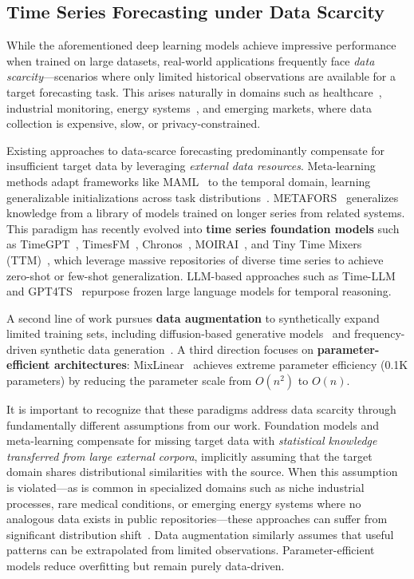 \subsection{Time Series Forecasting under Data Scarcity}

While the aforementioned deep learning models achieve impressive performance when trained on large datasets, real-world applications frequently face \emph{data scarcity}---scenarios where only limited historical observations are available for a target forecasting task. This arises naturally in domains such as healthcare~\citep{li2024survey}, industrial monitoring, energy systems~\citep{zhang2024prior}, and emerging markets, where data collection is expensive, slow, or privacy-constrained.

Existing approaches to data-scarce forecasting predominantly compensate for insufficient target data by leveraging \emph{external data resources}. Meta-learning methods adapt frameworks like MAML~\citep{finn2017model} to the temporal domain, learning generalizable initializations across task distributions~\citep{iwata2020few, oreshkin2021meta}. METAFORS~\citep{gasthaus2025metafors} generalizes knowledge from a library of models trained on longer series from related systems. This paradigm has recently evolved into \textbf{time series foundation models} such as TimeGPT~\citep{garza2024timegpt}, TimesFM~\citep{das2024decoder}, Chronos~\citep{ansari2024chronos}, MOIRAI~\citep{woo2024unified}, and Tiny Time Mixers (TTM)~\citep{ekambaram2024ttms}, which leverage massive repositories of diverse time series to achieve zero-shot or few-shot generalization. LLM-based approaches such as Time-LLM~\citep{jin2024timellm} and GPT4TS~\citep{zhou2023one} repurpose frozen large language models for temporal reasoning.

A second line of work pursues \textbf{data augmentation} to synthetically expand limited training sets, including diffusion-based generative models~\citep{gupta2025generation} and frequency-driven synthetic data generation~\citep{patel2025freqsynth}. A third direction focuses on \textbf{parameter-efficient architectures}: MixLinear~\citep{wang2024mixlinear} achieves extreme parameter efficiency (0.1K parameters) by reducing the parameter scale from $O(n^2)$ to $O(n)$.

It is important to recognize that these paradigms address data scarcity through fundamentally different assumptions from our work. Foundation models and meta-learning compensate for missing target data with \emph{statistical knowledge transferred from large external corpora}, implicitly assuming that the target domain shares distributional similarities with the source. When this assumption is violated---as is common in specialized domains such as niche industrial processes, rare medical conditions, or emerging energy systems where no analogous data exists in public repositories---these approaches can suffer from significant distribution shift~\citep{jin2024timellm}. Data augmentation similarly assumes that useful patterns can be extrapolated from limited observations. Parameter-efficient models reduce overfitting but remain purely data-driven.

